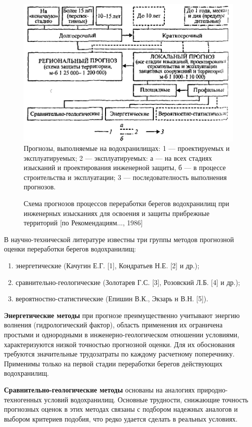 \documentclass[732,14pt,final]{studrep}
\begin{document}
\begin{center}
  \begin{figure}[htp]
	\centering
	\includegraphics[width=0.8\linewidth]{pics/image4.png}
    Прогнозы, выполняемые на водохранилищах: 1 — проектируемых и эксплуатируемых; 2 — эксплуатируемых: а — на всех стадиях изысканий и проектирования инженерной защиты, б — в процессе строительства и эксплуатации; 3 — последователность выполнения прогнозов.
    \caption{Схема прогнозов процессов переработки берегов водохранилищ при инженерных изысканиях для освоения и защиты прибрежные территорий [по Рекомендациям..., 1986]}
    \label{fig:prognosys-schema}
  \end{figure}
\end{center}


В научно-технической литературе известны три группы методов прогнозной оценки переработки берегов водохранилищ:
\begin{enumerate}
\item энергетические (Качугин Е.Г. [1], Кондратьев Н.Е. [2] и др.);
\item сравнительно-геологические (Золотарев Г.С. [3], Розовский Л.Б. [4] и др.);
\item вероятностно-статистические (Епишин В.К., Экзарь н В.Н. [5]).
\end{enumerate}

\textbf{Энергетические методы} при прогнозе преимущественно учитывают энергию волнения (гидрологический фактор), область применения их ограничена простыми и однородными в инженерно-геологическом отношении условиями, характеризуются низкой точностью прогнозной оценки. Для их обоснования требуются значительные трудозатраты по каждому расчетному поперечнику. Применимы только на первой стадии переработки берегов действующих водохранилищ.

\textbf{Сравнительно-геологические методы}  основаны на аналогиях природно-техногенных условий водохранилищ. Основные трудности, снижающие точность прогнозных оценок в этих методах связаны с подбором надежных аналогов и выбором критериев подобия, что редко удается сделать в реальных условиях.
\end{document}

